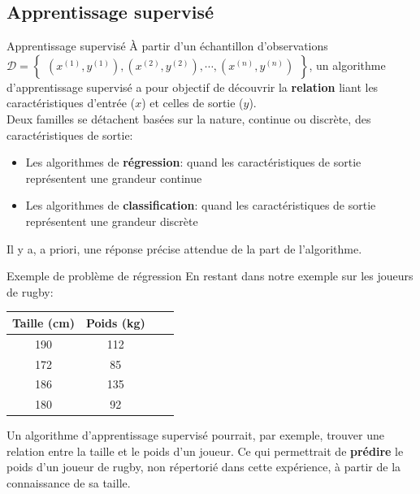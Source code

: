 \subsection[Apprentissage supervisé]{Apprentissage supervisé}

\begin{frame}{Apprentissage supervisé}
	\`A partir d'un échantillon d'observations $\mathcal{D} = \begin{Bmatrix}(x^{(1)}, y^{(1)}), (x^{(2)}, y^{(2)}), \cdots, (x^{(n)}, y^{(n)})\end{Bmatrix}$, un algorithme d'apprentissage supervisé a pour objectif de découvrir la \textbf{relation} liant les caractéristiques d'entrée ($x$) et celles de sortie ($y$). \\
	\vspace{0.5cm}
	Deux familles se détachent basées sur la nature, continue ou discrète, des caractéristiques de sortie:
	\begin{itemize}
		\item Les algorithmes de \textbf{régression}: quand les caractéristiques de sortie représentent une grandeur continue
		\item Les algorithmes de \textbf{classification}: quand les caractéristiques de sortie représentent une grandeur discrète
	\end{itemize}
	\vspace{0.5cm}
	Il y a, a priori, une réponse précise attendue de la part de l'algorithme.
\end{frame}

\begin{frame}{Exemple de problème de régression}
	En restant dans notre exemple sur les joueurs de rugby:
	\begin{table}
		\centering
		\begin{tabular}{|c|c|c|c|}
			\hline
			\textbf{Taille} (cm) & \textbf{Poids} (kg) \\ \hline
			190             & 112 \\
			172             & 85  \\
			186             & 135 \\
			180             & 92  \\
			\hline
		\end{tabular}
	\end{table}
	Un algorithme d'apprentissage supervisé pourrait, par exemple, trouver une relation entre la taille et le poids d'un joueur. Ce qui permettrait de \textbf{prédire} le poids d'un joueur de rugby, non répertorié dans cette expérience, à partir de la connaissance de sa taille.
\end{frame}

